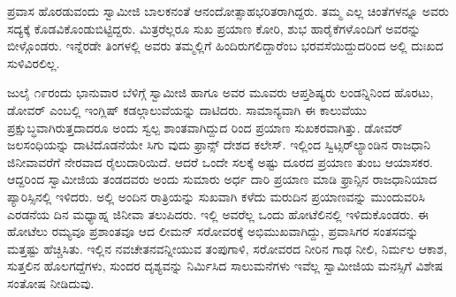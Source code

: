 ಪ್ರವಾಸ ಹೊರಡುವಂದು ಸ್ವಾಮೀಜಿ ಬಾಲಕನಂತೆ ಆನಂದೋತ್ಸಾಹಭರಿತರಾಗಿದ್ದರು. ತಮ್ಮ ಎಲ್ಲ ಚಿಂತೆಗಳನ್ನೂ ಅವರು ಸದ್ಯಕ್ಕೆ ಕೊಡವಿಕೊಂಡುಬಿಟ್ಟಿದ್ದರು. ಮಿತ್ರರೆಲ್ಲರೂ ಸುಖ ಪ್ರಯಾಣ ಕೋರಿ, ಶುಭ ಹಾರೈಕೆಗಳೊಂದಿಗೆ ಅವರನ್ನು ಬೀಳ್ಗೊಂಡರು. ಇನ್ನೆರಡೇ ತಿಂಗಳಲ್ಲಿ ಅವರು ತಮ್ಮಲ್ಲಿಗೆ ಹಿಂದಿರುಗಲಿದ್ದಾರೆಂಬ ಭರವಸೆಯಿದ್ದುದರಿಂದ ಅಲ್ಲಿ ದುಃಖದ ಸುಳಿವಿರಲಿಲ್ಲ.

ಜುಲೈ ೧೯ರಂದು ಭಾನುವಾರ ಬೆಳಿಗ್ಗೆ ಸ್ವಾಮೀಜಿ ಹಾಗೂ ಅವರ ಮೂವರು ಆಪ್ತಶಿಷ್ಯರು ಲಂಡನ್ನಿನಿಂದ ಹೊರಟು, ಡೋವರ್ ಎಂಬಲ್ಲಿ ಇಂಗ್ಲಿಷ್ ಕಡಲ್ಗಾಲುವೆಯನ್ನು ದಾಟಿದರು. ಸಾಮಾನ್ಯವಾಗಿ ಈ ಕಾಲುವೆಯು ಪ್ರಕ್ಷುಬ್ಧವಾಗಿರುತ್ತದಾದರೂ ಅಂದು ಸ್ವಲ್ಪ ಶಾಂತವಾಗಿದ್ದುದ ರಿಂದ ಪ್ರಯಾಣ ಸುಖಕರವಾಗಿತ್ತು. ಡೋವರ್ ಜಲಸಂಧಿಯನ್ನು ದಾಟಿದೊಡನೆಯೇ ಸಿಗು ವುದು ಫ್ರಾನ್ಸ್ ದೇಶದ ಕಲೇಸ್. ಇಲ್ಲಿಂದ ಸ್ವಿಟ್ಸರ್​ಲ್ಯಾಂಡಿನ ರಾಜಧಾನಿ ಜಿನೀವಾವರೆಗೆ ನೇರವಾದ ರೈಲುದಾರಿಯಿದೆ. ಆದರೆ ಒಂದೇ ಸಲಕ್ಕೆ ಅಷ್ಟು ದೂರದ ಪ್ರಯಾಣ ತುಂಬ ಆಯಾಸಕರ. ಆದ್ದರಿಂದ ಸ್ವಾಮೀಜಿಯ ತಂಡದವರು ಅಂದು ಸುಮಾರು ಅರ್ಧ ದಾರಿ ಪ್ರಯಾಣ ಮಾಡಿ ಫ್ರಾನ್ಸಿನ ರಾಜಧಾನಿಯಾದ ಪ್ಯಾರಿಸ್ಸಿನಲ್ಲಿ ಇಳಿದರು. ಅಲ್ಲಿ ಅಂದಿನ ರಾತ್ರಿಯನ್ನು ಸುಖವಾಗಿ ಕಳೆದು ಮರುದಿನ ಪ್ರಯಾಣವನ್ನು ಮುಂದುವರಿಸಿ ಎರಡನೆಯ ದಿನ ಮಧ್ಯಾಹ್ನ ಜಿನೀವಾ ತಲುಪಿದರು. ಇಲ್ಲಿ ಅವರೆಲ್ಲ ಒಂದು ಹೋಟೆಲಿನಲ್ಲಿ ಇಳಿದುಕೊಂಡರು. ಈ ಹೋಟೆಲು ರಮ್ಯವೂ ಪ್ರಶಾಂತವೂ ಆದ ಲೀಮನ್ ಸರೋವರಕ್ಕೆ ಅಭಿಮುಖವಾಗಿದ್ದು, ಪ್ರವಾಸಿಗರ ಸಂತಸವನ್ನು ಮತ್ತಷ್ಟು ಹೆಚ್ಚಿಸಿತು. ಇಲ್ಲಿನ ನವಚೇತನವನ್ನೀಯುವ ತಂಪುಗಾಳಿ, ಸರೋವರದ ನೀರಿನ ಗಾಢ ನೀಲಿ, ನಿರ್ಮಲ ಆಕಾಶ, ಸುತ್ತಲಿನ ಹೊಲಗದ್ದೆಗಳು, ಸುಂದರ ದೃಶ್ಯವನ್ನು ನಿರ್ಮಿಸಿದ ಸಾಲುಮನೆಗಳು ಇವೆಲ್ಲ ಸ್ವಾಮೀಜಿಯ ಮನಸ್ಸಿಗೆ ವಿಶೇಷ ಸಂತೋಷ ನೀಡಿದುವು.

